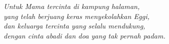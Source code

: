 \acknowledgment
\begin{centering}
\vfill
\emph{Untuk Mama tercinta di kampung halaman,\\yang telah berjuang keras menyekolahkan Eggi,\\dan keluarga tercinta yang selalu mendukung,\\dengan cinta abadi dan doa yang tak pernah padam.\\[.5cm]}
\vfill
\end{centering}
